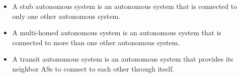 \begin{itemize}
\item A stub autonomous system is an autonomous system that is connected to only one other autonomous system.
\item A multi-homed autonomous system is an autonomous system that is connected to more than one other autonomous system.
\item A transit autonomous system is an autonomous system that provides its neighbor ASs to connect to each other through itself.
\end{itemize}
